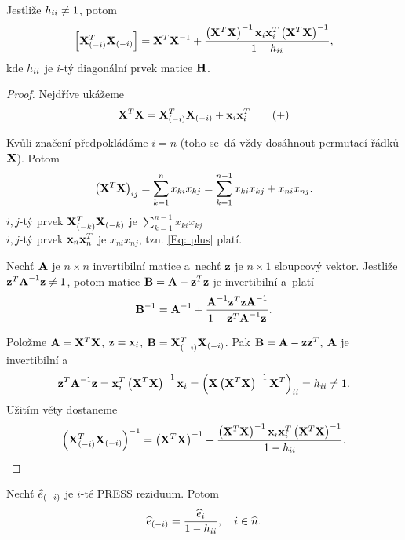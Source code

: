 \newcommand{\XtX}{\left(\X^T \X \right)^{-1}}

\begin{theorem}
Jestliže $h_{ii} \neq 1$, potom
 $$
\left[\Xmi^T \Xmi \right] = \X^T \inv{\X} + \frac{\XtX \x_i \x_i^T \XtX}{1 - \hii},
 $$
kde $h_{ii}$ je $i$-tý diagonální prvek matice $\textbf{H}$.
\end{theorem}

\begin{proof}
Nejdříve ukážeme
\begin{equation*}
	\mathbf{X}^T \mathbf{X} = \mathbf{X}_{(-i)}^T \mathbf{X}_{(-i)} + \mathbf{x}_i \mathbf{x}_i^T \tag{+} \label{Eq: plus}
\end{equation*}

\newcommand{\sumkn}{\sum_{k = 1}^n}
\newcommand{\sumknn}{\sum_{k = 1}^{n-1}}

Kvůli značení předpokládáme $i = n$ (toho se~dá vždy dosáhnout permutací řádků $\mathbf{X}$). Potom
 $$
\left(\X^T \X \right)_{ij} = \sumkn x_{ki} x_{kj} = \sumknn x_{ki} x_{kj} + x_{ni} x_{nj}.
 $$
 $i,j$-tý prvek $\mathbf{X}_{(-k)}^T \mathbf{X}_{(-k)}$ je $\sumknn x_{ki} x_{kj}$ \\
 $i,j$-tý prvek $\mathbf{x}_n \mathbf{x}_n^T$ je $x_{ni} x_{nj}$, tzn. \eqref{Eq: plus} platí.



\begin{theorem}
Nechť $\textbf{A}$ je $n \times n$ invertibilní matice a~nechť $\mathbf{z}$ je $n \times 1$ sloupcový vektor. Jestliže $\mathbf{z}^T {\textbf{A}^{-1}} \mathbf{z} \neq 1$, potom matice $\textbf{B} = \textbf{A} - \mathbf{z}^T \mathbf{z}$ je invertibilní a~platí
 $$
{\textbf{B}^{-1}} = {\textbf{A}^{-1}} + \frac{{\textbf{A}^{-1}} \mathbf{z}^T \mathbf{z} {\textbf{A}^{-1}}}{1 - \mathbf{z}^T {\textbf{A}^{-1}} \mathbf{z}}.
 $$
\end{theorem}

Položme $\textbf{A} = \mathbf{X}^T \mathbf{X}$, $\mathbf{z} = \mathbf{x}_i$, $\textbf{B} = \mathbf{X}_{(-i)}^T \mathbf{X}_{(-i)}$. Pak $\textbf{B} = \textbf{A} - \mathbf{z} \mathbf{z}^T$, $\textbf{A}$ je invertibilní a
 $$
\z^T \inv{\Am} \z = \x_i^T \XtX \x_i = \left(\X \XtX \X^T \right)_{ii} = \hii \neq 1.
 $$
Užitím věty dostaneme
 $$
\left(\X_{(-i)}^T \X_{(-i)} \right)^{-1} = \XtX + \frac{\XtX \x_i \x_i^T \XtX}{1 - \hii}.
 $$

\end{proof}

\begin{theorem}
	Nechť $\widehat{e}_{(-i)}$ je $i$-té PRESS reziduum. Potom
	 $$
	\widehat{e}_{(-i)} = \frac{\widehat{e}_i}{1 - h_{ii}}, \quad i\in\widehat{n}.
	 $$
\end{theorem}


